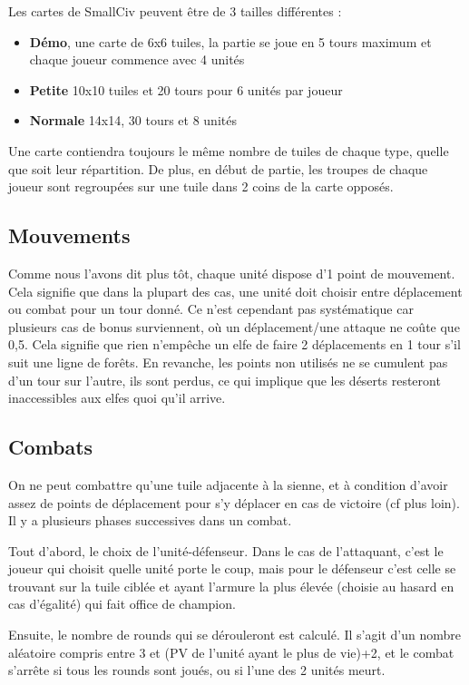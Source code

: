 Les cartes de SmallCiv peuvent être de 3 tailles différentes :
\begin{itemize}\renewcommand{\labelitemi}{$\bullet$}
\item \textbf{Démo}, une carte de 6x6 tuiles, la partie se joue en 5 tours maximum et chaque joueur commence avec 4 unités
\item \textbf{Petite}  10x10 tuiles et 20 tours pour 6 unités par joueur
\item \textbf{Normale} 14x14, 30 tours et 8 unités
\end{itemize}
Une carte contiendra toujours le même nombre de tuiles de chaque type, quelle que soit leur répartition. De plus, en début de partie, les troupes de chaque joueur sont regroupées sur une tuile dans 2 coins de la carte opposés. 

\subsection{Mouvements}
Comme nous l'avons dit plus tôt, chaque unité dispose d'1 point de mouvement. Cela signifie que dans la plupart des cas, une unité doit choisir entre déplacement ou combat pour un tour donné. Ce n'est cependant pas systématique car plusieurs cas de bonus surviennent, où un déplacement/une attaque ne coûte que 0,5. Cela signifie que rien n'empêche un elfe de faire 2 déplacements en 1 tour s'il suit une ligne de forêts.\newline
En revanche, les points non utilisés ne se cumulent pas d'un tour sur l'autre, ils sont perdus, ce qui implique que les déserts resteront inaccessibles aux elfes quoi qu'il arrive. 

\subsection{Combats}
On ne peut combattre qu'une tuile adjacente à la sienne, et à condition d'avoir assez de points de déplacement pour s'y déplacer en cas de victoire (cf plus loin). Il y a plusieurs phases successives dans un combat. \newline

Tout d'abord, le choix de l'unité-défenseur. Dans le cas de l'attaquant, c'est le joueur qui choisit quelle unité porte le coup, mais pour le défenseur c'est celle se trouvant sur la tuile ciblée et ayant l'armure la plus élevée (choisie au hasard en cas d'égalité) qui fait office de champion. \newline

Ensuite, le nombre de rounds qui se dérouleront est calculé. Il s'agit d'un nombre aléatoire compris entre 3 et (PV de l'unité ayant le plus de vie)+2, et le combat s'arrête si tous les rounds sont joués, ou si l'une des 2 unités meurt.\newline

